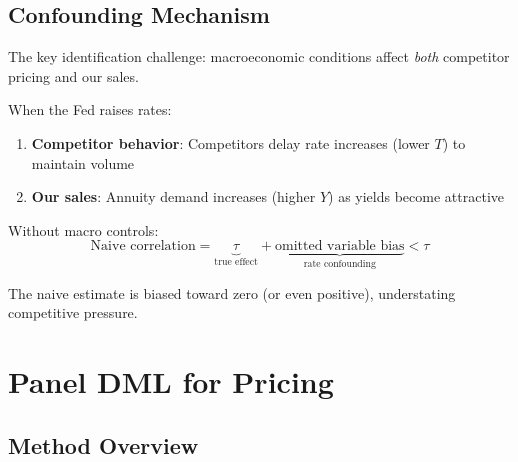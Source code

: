 
\subsection{Confounding Mechanism}

The key identification challenge: macroeconomic conditions affect \emph{both} competitor pricing and our sales.

\begin{example}
\label{ex:rate_confounding}
When the Fed raises rates:
\begin{enumerate}
    \item \textbf{Competitor behavior}: Competitors delay rate increases (lower $T$) to maintain volume
    \item \textbf{Our sales}: Annuity demand increases (higher $Y$) as yields become attractive
\end{enumerate}

Without macro controls:
\[
\text{Naive correlation} = \underbrace{\tau}_{\text{true effect}} + \underbrace{\text{omitted variable bias}}_{\text{rate confounding}} < \tau
\]

The naive estimate is biased toward zero (or even positive), understating competitive pressure.
\end{example}

\section{Panel DML for Pricing}\label{sec:panel_dml_pricing}

\subsection{Method Overview}

